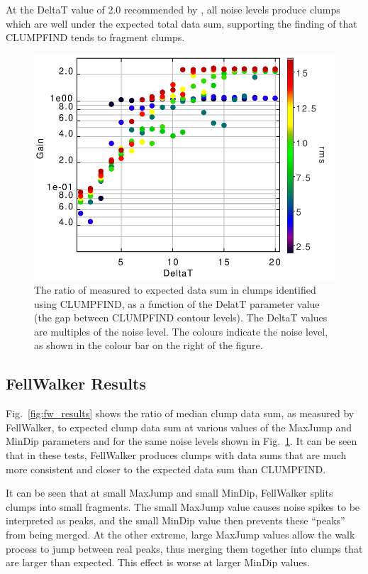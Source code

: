 \documentclass[final,authoryear,5p,times,twocolumn]{elsarticle}
\begin{document}
At the DeltaT value of 2.0 recommended by \cite{1994Williams}, all noise
levels produce clumps which are well under the expected total data sum,
supporting the finding of \cite{2010Watson} that CLUMPFIND tends to
fragment clumps.

\begin{figure}
\includegraphics[width=\columnwidth]{comp4_cf}
\caption{The ratio of measured to expected data sum in clumps identified
using CLUMPFIND, as a function of the DelatT parameter value (the gap
between CLUMPFIND contour levels). The DeltaT values are multiples of the
noise level. The colours indicate the noise level, as shown in the colour
bar on the right of the figure.}
\label{fig:cf_results}
\end{figure}

\subsection{FellWalker Results}
Fig.~\ref{fig:fw_results} shows the ratio of median clump data sum, as
measured by FellWalker, to expected clump data sum at various values of
the MaxJump and MinDip parameters and for the same noise levels shown in
Fig.~\ref{fig:cf_results}. It can be seen that in these tests, FellWalker
produces clumps with data sums that are much more consistent and closer
to the expected data sum than CLUMPFIND.

It can be seen that at small MaxJump and small MinDip, FellWalker splits
clumps into small fragments. The small MaxJump value causes noise spikes
to be interpreted as peaks, and the small MinDip value then prevents these
``peaks'' from being merged. At the other extreme, large MaxJump values
allow the walk process to jump between real peaks, thus merging them
together into clumps that are larger than expected. This effect is worse
at larger MinDip values.
\end{document}
